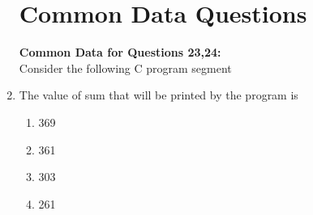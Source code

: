 \documentclass[journal,12pt,onecolumn]{IEEEtran}
\theoremstyle{remark}
\begin{document}
\begin{enumerate}
\section{Common Data Questions}
\textbf{Common Data for Questions 23,24:}
\\Consider the following C program segment\\

\item The value of sum that will be printed by the program is
\begin{multicols}{4}
\begin{enumerate}
\item 369
\item 361
\item 303
\item 261
\end{enumerate} 
\end{multicols}

\end{enumerate}
\end{document}

